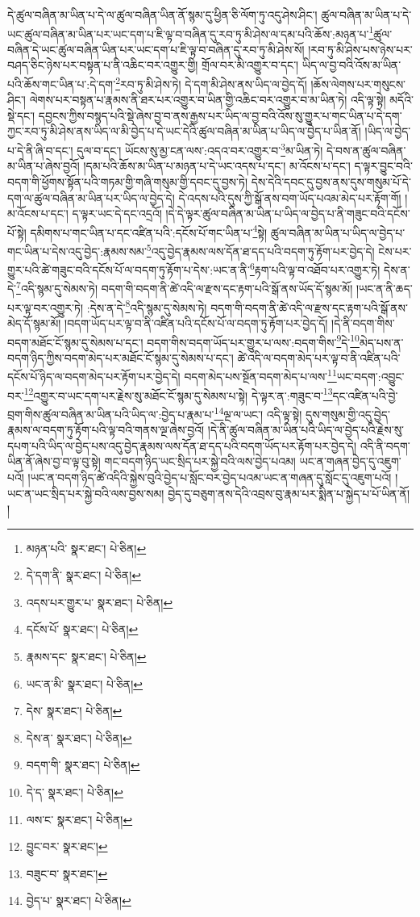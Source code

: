 དེ་ཚུལ་བཞིན་མ་ཡིན་པ་དེ་ལ་ཚུལ་བཞིན་ཡིན་ནོ་སྙམ་དུ་ཕྱིན་ཅི་ལོག་ཏུ་འདུ་ཤེས་ཤིང་། ཚུལ་བཞིན་མ་ཡིན་པ་དེ་ཡང་ཚུལ་བཞིན་མ་ཡིན་པར་ཡང་དག་པ་ཇི་ལྟ་བ་བཞིན་དུ་རབ་ཏུ་མི་ཤེས་ལ་དམ་པའི་ཆོས་:མཉན་པ་\footnote{མཉན་པའི་  སྣར་ཐང་།  པེ་ཅིན། }ཚུལ་བཞིན་དེ་ཡང་ཚུལ་བཞིན་ཡིན་པར་ཡང་དག་པ་ཇི་ལྟ་བ་བཞིན་དུ་རབ་ཏུ་མི་ཤེས་སོ། །རབ་ཏུ་མི་ཤེས་པས་ཉེས་པར་བཤད་ཅིང་ཉེས་པར་བསྟན་པ་ནི་འཆིང་བར་འགྱུར་གྱི། གྲོལ་བར་མི་འགྱུར་བ་དང་། ཡིད་ལ་བྱ་བའི་འོས་མ་ཡིན་པའི་ཆོས་གང་ཡིན་པ་:དེ་དག་\footnote{དེ་དག་ནི་  སྣར་ཐང་།  པེ་ཅིན། }རབ་ཏུ་མི་ཤེས་ཏེ། དེ་དག་མི་ཤེས་ནས་ཡིད་ལ་བྱེད་དོ། །ཆོས་ལེགས་པར་གསུངས་ཤིང་། ལེགས་པར་བསྟན་པ་རྣམས་ནི་ཐར་པར་འགྱུར་བ་ཡིན་གྱི་འཆིང་བར་འགྱུར་བ་མ་ཡིན་ཏེ། འདི་ལྟ་སྟེ། མདོའི་སྡེ་དང་། དབྱངས་ཀྱིས་བསྙད་པའི་སྡེ་ཞེས་བྱ་བ་ནས་རྒྱས་པར་ཡིད་ལ་བྱ་བའི་འོས་སུ་གྱུར་པ་གང་ཡིན་པ་དེ་དག་ཀྱང་རབ་ཏུ་མི་ཤེས་ནས་ཡིད་ལ་མི་བྱེད་པ་དེ་ཡང་དེའི་ཚུལ་བཞིན་མ་ཡིན་པ་ཡིད་ལ་བྱེད་པ་ཡིན་ནོ། །ཡིད་ལ་བྱེད་པ་དེ་ནི་ཞི་བ་དང་། དུལ་བ་དང་། ཡོངས་སུ་མྱ་ངན་ལས་:འདའ་བར་འགྱུར་བ་\footnote{འདས་པར་གྱུར་པ་  སྣར་ཐང་།  པེ་ཅིན། }མ་ཡིན་ཏེ། དེ་བས་ན་ཚུལ་བཞིན་མ་ཡིན་པ་ཞེས་བྱའོ། །དམ་པའི་ཆོས་མ་ཡིན་པ་མཉན་པ་དེ་ཡང་འདས་པ་དང་། མ་འོངས་པ་དང་། ད་ལྟར་བྱུང་བའི་བདག་གི་ཕྱོགས་སྟོན་པའི་གཏམ་གྱི་གཞི་གསུམ་གྱི་དབང་དུ་བྱས་ཏེ། དེས་དེའི་དབང་དུ་བྱས་ནས་དུས་གསུམ་པོ་དེ་དག་ལ་ཚུལ་བཞིན་མ་ཡིན་པར་ཡིད་ལ་བྱེད་དེ། དེ་འདས་པའི་དུས་ཀྱི་སྒོ་ནས་བག་ཡོད་པའམ་མེད་པར་རྟོག་གོ། །མ་འོངས་པ་དང་། ད་ལྟར་ཡང་དེ་དང་འདྲའོ། །དེ་དེ་ལྟར་ཚུལ་བཞིན་མ་ཡིན་པ་ཡིད་ལ་བྱེད་པ་ནི་གཟུང་བའི་དངོས་པོ་སྟེ། དམིགས་པ་གང་ཡིན་པ་དང་འཛིན་པའི་:དངོས་པོ་གང་ཡིན་པ་\footnote{དངོས་པོ་  སྣར་ཐང་།  པེ་ཅིན། }སྟེ། ཚུལ་བཞིན་མ་ཡིན་པ་ཡིད་ལ་བྱེད་པ་གང་ཡིན་པ་དེས་འདུ་བྱེད་:རྣམས་སམ་\footnote{རྣམས་དང་  སྣར་ཐང་།  པེ་ཅིན། }འདུ་བྱེད་རྣམས་ལས་དོན་ཐ་དད་པའི་བདག་ཏུ་རྟོག་པར་བྱེད་དེ། ངེས་པར་གྱུར་པའི་ཚེ་གཟུང་བའི་དངོས་པོ་ལ་བདག་ཏུ་རྟོག་པ་དེས་:ཡང་ན་ནི་\footnote{ཡང་ན་མི་  སྣར་ཐང་།  པེ་ཅིན། }རྟག་པའི་ལྟ་བ་འཐོབ་པར་འགྱུར་ཏེ། དེས་ན་དེ་\footnote{དེས་  སྣར་ཐང་།  པེ་ཅིན། }འདི་སྙམ་དུ་སེམས་ཏེ། བདག་གི་བདག་ནི་ཚེ་འདི་ལ་རྫས་དང་རྟག་པའི་སྒོ་ནས་ཡོད་དོ་སྙམ་མོ། །ཡང་ན་ནི་ཆད་པར་ལྟ་བར་འགྱུར་ཏེ། :དེས་ན་དེ་\footnote{དེས་ན་  སྣར་ཐང་།  པེ་ཅིན། }འདི་སྙམ་དུ་སེམས་ཏེ། བདག་གི་བདག་ནི་ཚེ་འདི་ལ་རྫས་དང་རྟག་པའི་སྒོ་ནས་མེད་དོ་སྙམ་མོ། །བདག་ཡོད་པར་ལྟ་བ་ནི་འཛིན་པའི་དངོས་པོ་ལ་བདག་ཏུ་རྟོག་པར་བྱེད་དོ། །དེ་ནི་བདག་གིས་བདག་མཐོང་ངོ་སྙམ་དུ་སེམས་པ་དང་། བདག་གིས་བདག་ཡོད་པར་གྱུར་པ་ལས་:བདག་གིས་\footnote{བདག་གི་  སྣར་ཐང་།  པེ་ཅིན། }དེ་\footnote{དེ་ད་  སྣར་ཐང་།  པེ་ཅིན། }མེད་པས་ན་བདག་ཉིད་ཀྱིས་བདག་མེད་པར་མཐོང་ངོ་སྙམ་དུ་སེམས་པ་དང་། ཚེ་འདི་ལ་བདག་མེད་པར་ལྟ་བ་ནི་འཛིན་པའི་དངོས་པོ་ཉིད་ལ་བདག་མེད་པར་རྟོག་པར་བྱེད་དེ། བདག་མེད་པས་སྔོན་བདག་མེད་པ་ལས་\footnote{ལས་ང་  སྣར་ཐང་།  པེ་ཅིན། }ཡང་བདག་:འབྱུང་བར་\footnote{བྱུང་བར་  སྣར་ཐང་། }འགྱུར་བ་ཡང་དག་པར་རྗེས་སུ་མཐོང་ངོ་སྙམ་དུ་སེམས་པ་སྟེ། དེ་ལྟར་ན་:གཟུང་བ་\footnote{བཟུང་བ་  སྣར་ཐང་། }དང་འཛིན་པའི་བྱེ་བྲག་གིས་ཚུལ་བཞིན་མ་ཡིན་པའི་ཡིད་ལ་:བྱེད་པ་རྣམ་པ་\footnote{བྱེད་པ་  སྣར་ཐང་།  པེ་ཅིན། }ལྔ་ལ་ཡང་། འདི་ལྟ་སྟེ། དུས་གསུམ་གྱི་འདུ་བྱེད་རྣམས་ལ་བདག་ཏུ་རྟོག་པའི་ལྟ་བའི་གནས་ལྔ་ཞེས་བྱའོ། །དེ་ནི་ཚུལ་བཞིན་མ་ཡིན་པའི་ཡིད་ལ་བྱེད་པའི་རྗེས་སུ་དཔག་པའི་ཡིད་ལ་བྱེད་པས་འདུ་བྱེད་རྣམས་ལས་དོན་ཐ་དད་པའི་བདག་ཡོད་པར་རྟོག་པར་བྱེད་དེ། འདི་ནི་བདག་ཡིན་ནོ་ཞེས་བྱ་བ་ལྟ་བུ་སྟེ། གང་བདག་ཉིད་ཡང་སྲིད་པར་སྐྱེ་བའི་ལས་བྱེད་པའམ། ཡང་ན་གཞན་བྱེད་དུ་འཇུག་པའོ། །ཡང་ན་བདག་ཉིད་ཚེ་འདིའི་སྐྱེས་བུའི་བྱེད་པ་སློང་བར་བྱེད་པའམ་ཡང་ན་གཞན་དུ་སློང་དུ་འཇུག་པའོ། །ཡང་ན་ཡང་སྲིད་པར་སྐྱེ་བའི་ལས་བྱས་སམ། བྱེད་དུ་བཅུག་ནས་དེའི་འབྲས་བུ་རྣམ་པར་སྨིན་པ་སྐྱེད་པ་པོ་ཡིན་ནོ། །
